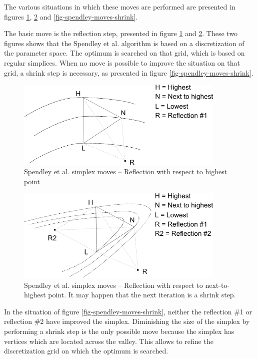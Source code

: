 The various situations in which these moves are performed are 
presented in figures \ref{fig-spendley-moves-reflect}, \ref{fig-spendley-moves-reflect2}
and \ref{fig-spendley-moves-shrink}.

The basic move is the reflection step, presented in figure 
\ref{fig-spendley-moves-reflect} and \ref{fig-spendley-moves-reflect2}. 
These two figures shows that the Spendley et al.
algorithm is based on a discretization of the parameter space. 
The optimum is searched on that grid, which is based on regular simplices.
When no move is possible to improve the situation on that grid,
a shrink step is necessary, as presented in figure \ref{fig-spendley-moves-shrink}.

\begin{figure}
\begin{center}
\includegraphics[width=10cm]{spendley-steps-reflect.png}
\end{center}
\caption{Spendley et al. simplex moves -- Reflection with respect to highest point}
\label{fig-spendley-moves-reflect}
\end{figure}

\begin{figure}
\begin{center}
\includegraphics[width=10cm]{spendley-steps-reflect2.png}
\end{center}
\caption{Spendley et al. simplex moves -- Reflection with respect to next-to-highest point. 
It may happen that the next iteration is a shrink step.}
\label{fig-spendley-moves-reflect2}
\end{figure}

In the situation of figure \ref{fig-spendley-moves-shrink}, neither the 
reflection \#1 or reflection \#2 have improved the simplex. 
Diminishing the size of the simplex by performing a shrink step 
is the only possible move because the 
simplex has vertices which are located across the valley.
This allows to refine the discretization grid on which the 
optimum is searched.


